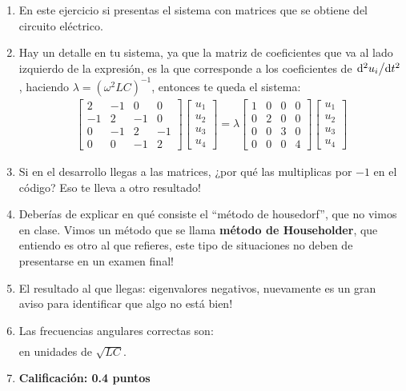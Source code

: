 \begin{enumerate}
\item En este ejercicio si presentas el sistema con matrices que se obtiene del circuito eléctrico.
\item Hay un detalle en tu sistema, ya que la matriz de coeficientes que va al lado izquierdo de la expresión, es la que corresponde a los coeficientes de $\dv*[2]{u_{i}}{t}$, haciendo $\lambda = (\omega^{2} L C)^{-1}$, entonces te queda el sistema:
\begin{align*}
\begin{bmatrix}
2 & -1 & 0 & 0 \\
-1 & 2 & -1 & 0 \\
0 & - 1 & 2 & -1 \\
0 & 0 & -1 & 2
\end{bmatrix}
\begin{bmatrix}
u_{1} \\
u_{2} \\
u_{3} \\
u_{4}
\end{bmatrix} = 
\lambda 
\begin{bmatrix}
1 & 0 & 0 & 0 \\
0 & 2 & 0 & 0 \\
0 & 0 & 3 & 0 \\
0 & 0 & 0 & 4
\end{bmatrix}
\begin{bmatrix}
u_{1} \\
u_{2} \\
u_{3} \\
u_{4}
\end{bmatrix}
\end{align*}
\item Si en el desarrollo llegas a las matrices, ¿por qué las multiplicas por $-1$ en el código? Eso te lleva a otro resultado!
\item Deberías de explicar en qué consiste el \enquote{método de housedorf}, que no vimos en clase. Vimos un método que se llama \textbf{método de Householder}, que entiendo es otro al que refieres, este tipo de situaciones no deben de presentarse en un examen final!
\item El resultado al que llegas: eigenvalores negativos, nuevamente es un gran aviso para identificar que algo no está bien!
\item Las frecuencias angulares correctas son:
\begin{align*}
[0.64711605 \quad 2.61701309 \quad 0.96278991 \quad 1.34369599]
\end{align*}
en unidades de $\sqrt{L C}$.
\item \textbf{Calificación: 0.4 puntos}
\end{enumerate}

